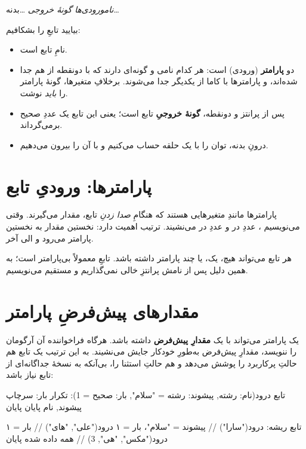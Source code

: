 \begin{center}
 \;\textit{نام}\;\code{(}\textit{ورودی‌ها}\code{)}\;\code{:}\; \textit{گونهٔ خروجی}\; \code{:} \quad\ldots\;بدنه\;\ldots\quad {}
\end{center}

بیایید تابعِ  را بشکافیم:
\begin{itemize}
  \item {} نامِ تابع است.
  \item {} دو \textbf{پارامتر} (ورودی) است: هر
        کدام نامی و گونه‌ای دارند که با دونقطه از هم جدا شده‌اند، و
        پارامترها با کاما از یکدیگر جدا می‌شوند. برخلافِ متغیرها، گونهٔ
        پارامتر را \emph{باید} نوشت.
  \item {} پس از پرانتز و دونقطه، \textbf{گونهٔ خروجیِ} تابع است؛ یعنی این
        تابع یک عددِ صحیح برمی‌گرداند.
  \item درونِ بدنه، توان را با یک حلقه حساب می‌کنیم و با 
        آن را بیرون می‌دهیم.
\end{itemize}

\section{پارامترها: ورودیِ تابع}

پارامترها مانندِ متغیرهایی هستند که هنگامِ \emph{صدا زدنِ} تابع، مقدار
می‌گیرند. وقتی می‌نویسیم ، عددِ  در  و
عددِ  در  می‌نشیند. ترتیب اهمیت دارد: نخستین مقدار به نخستین
پارامتر می‌رود و الی آخر.

\begin{note}
هر تابع می‌تواند هیچ، یک، یا چند پارامتر داشته باشد. تابعِ  معمولاً
بی‌پارامتر است؛ به همین دلیل پس از نامش پرانتزِ خالی نمی‌گذاریم و مستقیم
 می‌نویسیم.
\end{note}

\section{مقدارهای پیش‌فرضِ پارامتر}

یک پارامتر می‌تواند با \code{=} یک \textbf{مقدارِ پیش‌فرض} داشته باشد. هرگاه
فراخواننده آن آرگومان را ننویسد، مقدارِ پیش‌فرض به‌طورِ خودکار جایش می‌نشیند. به
این ترتیب یک تابع هم حالتِ پرکاربرد را پوشش می‌دهد و هم حالتِ استثنا را،
بی‌آنکه به نسخهٔ جداگانه‌ای از تابع نیاز باشد:

\begin{salamfa}
تابع درود(نام: رشته, پیشوند: رشته = "سلام", بار: صحیح = 1):
    تکرار بار:
        سرچاپ پیشوند, نام
    پایان
پایان

تابع ریشه:
    درود("سارا")              // پیشوند = "سلام"، بار = ۱
    درود("علی", "های")        // بار = ۱
    درود("مکس", "هی", 3)      // همه داده شده
پایان
\end{salamfa}


